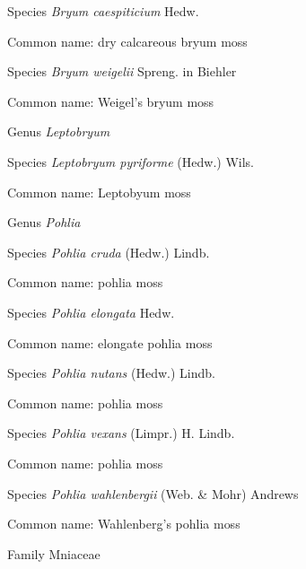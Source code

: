 \documentclass[9pt, article]{memoir}
\begin{document}
\begin{multicols}{2}
\vspace{6pt}\noindent\hspace{36pt}Species \textit{Bryum caespiticium} Hedw.


Common name: dry calcareous bryum moss

\vspace{6pt}\noindent\hspace{36pt}Species \textit{Bryum weigelii} Spreng. in Biehler


Common name: Weigel's bryum moss

\vspace{6pt}\noindent\hspace{30pt}Genus \textit{Leptobryum}


\vspace{6pt}\noindent\hspace{36pt}Species \textit{Leptobryum pyriforme} (Hedw.) Wils.


Common name: Leptobyum moss

\vspace{6pt}\noindent\hspace{30pt}Genus \textit{Pohlia}


\vspace{6pt}\noindent\hspace{36pt}Species \textit{Pohlia cruda} (Hedw.) Lindb.


Common name: pohlia moss

\vspace{6pt}\noindent\hspace{36pt}Species \textit{Pohlia elongata} Hedw.


Common name: elongate pohlia moss

\vspace{6pt}\noindent\hspace{36pt}Species \textit{Pohlia nutans} (Hedw.) Lindb.


Common name: pohlia moss

\vspace{6pt}\noindent\hspace{36pt}Species \textit{Pohlia vexans} (Limpr.) H. Lindb.


Common name: pohlia moss

\vspace{6pt}\noindent\hspace{36pt}Species \textit{Pohlia wahlenbergii} (Web. \& Mohr) Andrews


Common name: Wahlenberg's pohlia moss

\vspace{6pt}\noindent\hspace{24pt}Family Mniaceae



\end{multicols}
\end{document}
